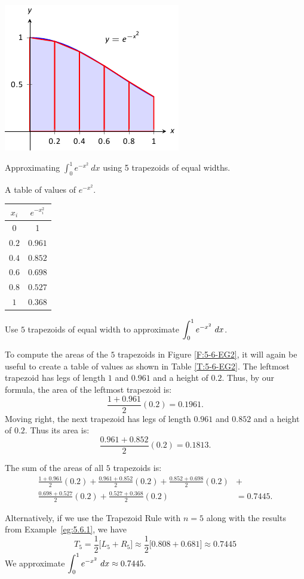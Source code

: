 \begin{marginfigure}[8cm] %
\includegraphics{figures/fignum3a} %
\caption{Approximating $\int_0^1 e^{-x^2}\ dx$ using 5 trapezoids of equal widths.}
\label{F:5-6-EG2}
\end{marginfigure}

\begin{margintable} %
\begin{center}
\caption{A table of values of $e^{-x^2}$.} 
\label{T:5-6-EG2} 
\begin{tabular}{cc}
$x_i$ & $e^{-x_i^2}$ \\ \hline
$0$ & 1\\
$0.2$ & $0.961$ \\
$0.4$ & $0.852$ \\
$0.6$ & $0.698$ \\
$0.8$ & $0.527$ \\
$1$ & $0.368$
\end{tabular}
\end{center}
\end{margintable}


\begin{example} \label{eg:5.6.2} %
Use $5$ trapezoids of equal width to approximate $\displaystyle \int_0^1e^{-x^2}\ dx$.

\solution To compute the areas of the $5$ trapezoids in Figure \ref{F:5-6-EG2}, it will again be useful to create a table of values as shown in Table \ref{T:5-6-EG2}. The leftmost trapezoid has legs of length $1$ and $0.961$ and a height of $0.2$. Thus, by our formula, the area of the leftmost trapezoid is: 
$$ \frac{1+0.961}{2}(0.2) = 0.1961.$$
Moving right, the next trapezoid has legs of length $0.961$ and $0.852$ and a height of $0.2$. Thus its area is: $$\frac{0.961+0.852}2(0.2) = 0.1813.$$

The sum of the areas of all $5$ trapezoids is:
\begin{align*}
\frac{1+0.961}{2}(0.2) + \frac{0.961+0.852}2(0.2)+\frac{0.852+0.698}2(0.2)&+ \\
\frac{0.698+0.527}2(0.2)+\frac{0.527+0.368}2(0.2)&= 0.7445.
\end{align*}

Alternatively, if we use the Trapezoid Rule with $n=5$ along with the results from Example~\ref{eg:5.6.1}, we have
\[ T_5  =  \frac{1}{2}\Big[L_5 + R_5 \Big] \approx \frac{1}{2}\Big[ 0.808 + 0.681 \Big] \approx 0.7445 \]
We approximate $\displaystyle \int_0^1 e^{-x^2}\ dx \approx 0.7445.$
\end{example}


